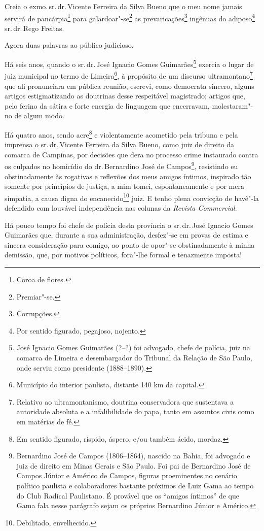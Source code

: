 Creia o exmo.\,sr.\,dr.\,Vicente Ferreira da Silva Bueno que o meu nome
jamais servirá de pancárpia\footnote{Coroa de flores.} para
galardoar"-se\footnote{Premiar"-se.} as prevaricações\footnote{
  Corrupções.} ingênuas do adiposo\footnote{Por sentido figurado,
  pegajoso, nojento.} sr.\,dr.\,Rego Freitas.

Agora duas palavras ao público judicioso.

Há seis anos, quando o sr.\,dr.\,José Ignacio Gomes Guimarães\footnote{
  José Ignacio Gomes Guimarães (?--?) foi advogado, chefe de polícia,
  juiz na comarca de Limeira e desembargador do Tribunal da Relação de
  São Paulo, onde serviu como presidente (1888--1890).} exercia o lugar
de juiz municipal no termo de Limeira\footnote{Município do interior
  paulista, distante 140 km da capital.}, à propósito de um discurso
ultramontano\footnote{Relativo ao ultramontanismo, doutrina
  conservadora que sustentava a autoridade absoluta e a infalibilidade
  do papa, tanto em assuntos civis como em matérias de fé.} que ali
pronunciara em pública reunião, escrevi, como democrata sincero, alguns
artigos estigmatizando as doutrinas desse respeitável magistrado;
artigos que, pelo ferino da sátira e forte energia de linguagem que
encerravam, molestaram"-no de algum modo.

Há quatro anos, sendo acre\footnote{Em sentido figurado, ríspido,
  áspero, e/ou também ácido, mordaz.} e violentamente acometido pela
tribuna e pela imprensa o sr.\,dr.\,Vicente Ferreira da Silva Bueno, como
juiz de direito da comarca de Campinas, por decisões que dera no
processo crime instaurado contra os culpados no homicídio do dr.\,Bernardino José de Campos\footnote{Bernardino José de Campos
  (1806--1864), nascido na Bahia, foi advogado e juiz de direito em Minas
  Gerais e São Paulo. Foi pai de Bernardino José de Campos Júnior e
  Américo de Campos, figuras proeminentes no cenário político paulista e
  colaboradores bastante próximos de Luiz Gama ao tempo do Club Radical
  Paulistano. É provável que os ``amigos íntimos'' de que Gama fala nesse
  parágrafo sejam os próprios Bernardino Júnior e Américo.}, resistindo
eu obstinadamente às rogativas e reflexões dos meus amigos íntimos,
inspirado tão somente por princípios de justiça, a mim tomei,
espontaneamente e por mera simpatia, a causa digna do
encanecido\footnote{Debilitado, envelhecido.} juiz. E tenho plena
convicção de havê"-la defendido com louvável independência nas colunas da
\emph{Revista Commercial}.

Há pouco tempo foi chefe de polícia desta província o sr.\,dr.\,José
Ignacio Gomes Guimarães que, durante a sua administração, desfez"-se em
provas de estima e sincera consideração para comigo, ao ponto de opor"-se
obstinadamente à minha demissão, que, por motivos políticos, fora"-lhe
formal e tenazmente imposta!

